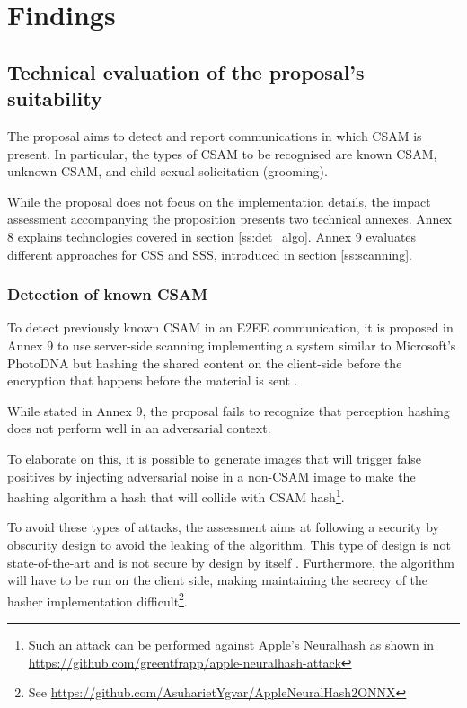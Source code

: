 \section{Findings}
\label{s:find}

\subsection{Technical evaluation of the proposal's suitability}

The proposal aims to detect and report communications in which CSAM is present. In particular, the types of CSAM to be recognised are known CSAM, unknown CSAM, and child sexual solicitation (grooming).

While the proposal does not focus on the implementation details, the impact assessment accompanying the proposition presents two technical annexes. Annex 8 explains technologies covered in section \ref{ss:det_algo}. Annex 9 evaluates different approaches for CSS and SSS, introduced in section \ref{ss:scanning}.

\subsubsection{Detection of known CSAM}
\label{sss:known_csam}

To detect previously known CSAM in an E2EE communication, it is proposed in Annex 9 to use server-side scanning implementing a system similar to Microsoft's PhotoDNA but hashing the shared content on the client-side before the encryption that happens before the material is sent \cite{eu2022impact}. 

While stated in Annex 9, the proposal fails to recognize that perception hashing does not perform well in an adversarial context. 

To elaborate on this, it is possible to generate images that will trigger false positives by injecting adversarial noise in a non-CSAM image to make the hashing algorithm a hash that will collide with CSAM hash\footnote{Such an attack can be performed against Apple's Neuralhash as shown in \url{https://github.com/greentfrapp/apple-neuralhash-attack}}.

To avoid these types of attacks, the assessment aims at following a security by obscurity design to avoid the leaking of the algorithm. This type of design is not state-of-the-art and is not secure by design by itself \cite{SandO}. Furthermore, the algorithm will have to be run on the client side, making maintaining the secrecy of the hasher implementation difficult\footnote{See \url{https://github.com/AsuharietYgvar/AppleNeuralHash2ONNX}}.

